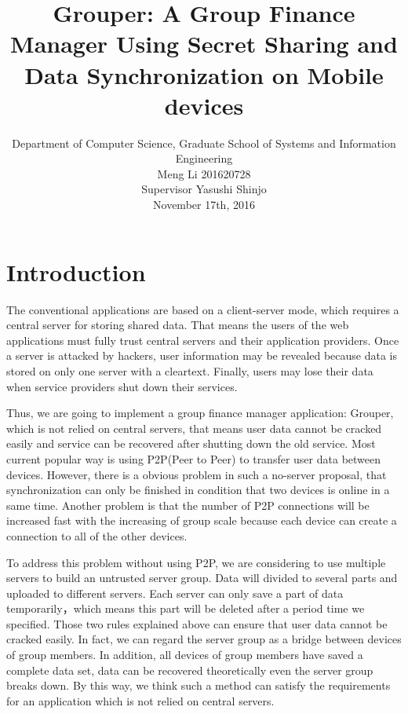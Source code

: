 \documentclass[twocolumn,10pt]{article}
\begin{document}
\date{}

\title{\bf Grouper: A Group Finance Manager Using Secret Sharing and Data Synchronization on Mobile devices}

\author{Department of Computer Science, Graduate School of Systems and Information Engineering 
	\\Meng Li 201620728  
	\\Supervisor Yasushi Shinjo
	\\November 17th, 2016}

\maketitle

\section{Introduction}
The conventional applications are based on a client-server mode, which requires a central server for storing shared data. That means the users of the web applications must fully trust central servers and their application providers. Once a server is attacked by hackers, user information may be revealed because data is stored on only one server with a cleartext. Finally, users may lose their data when service providers shut down their services.

Thus, we are going to implement a group finance manager application: Grouper, which is not relied on central servers, that means user data cannot be cracked easily and service can be recovered after shutting down the old service. Most current popular way is using P2P(Peer to Peer) to transfer user data between devices. However, there is a obvious problem in such a no-server proposal, that synchronization can only be finished in condition that two devices is online in a same time. Another problem is that the number of P2P connections will be increased fast with the increasing of group scale because each device can create a connection to all of the other devices. 

To address this problem without using P2P, we are considering to use multiple servers to build an untrusted server group. Data will divided to several parts and uploaded to different servers. Each server can only save a part of data temporarily，which means this part will be deleted after a period time we specified. Those two rules explained above can ensure that user data cannot be cracked easily. In fact, we can regard the server group as a bridge between devices of group members. In addition, all devices of group members have saved a complete data set, data can be recovered theoretically even the server group breaks down. By this way, we think such a method can satisfy the requirements for an application which is not relied on central servers.
\end{document}
